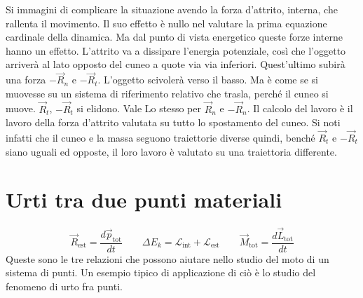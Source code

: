 \documentclass[10pt,a4paper]{book}
\begin{document}
Si immagini di complicare la situazione avendo la forza d'attrito, interna, che rallenta il movimento. Il suo effetto è nullo nel valutare la prima equazione cardinale della dinamica. Ma dal punto di vista energetico queste forze interne hanno un effetto. L'attrito va a dissipare l'energia potenziale, così che l'oggetto arriverà al lato opposto del cuneo a quote via via inferiori. Quest'ultimo subirà una forza $-\vec{R}_n$ e $-\vec{R}_t$. L'oggetto scivolerà verso il basso. Ma è come se si muovesse su un sistema di riferimento relativo che trasla, perché il cuneo si muove. $\vec{R}_t$, $-\vec{R}_t$ si elidono. Vale Lo stesso per $\vec{R}_n$ e $-\vec{R}_n$. Il calcolo del lavoro è il lavoro della forza d'attrito valutata su tutto lo spostamento del cuneo. Si noti infatti che il cuneo e la massa seguono traiettorie diverse quindi, benché $\vec{R}_t$ e $-\vec{R}_t$ siano uguali ed opposte, il loro lavoro è valutato su una traiettoria differente.







































\section{Urti tra due punti materiali}

\[
	\vec{R}_\text{est}=\frac{d\vec{p}_\text{tot}}{dt} \qquad \Delta E_k=\mathcal{L}_\text{int}+\mathcal{L}_\text{est} \qquad \vec{M}_\text{tot}=\frac{d\vec{L}_\text{tot}}{dt}
\]
Queste sono le tre relazioni che possono aiutare nello studio del moto di un sistema di punti. Un esempio tipico di applicazione di ciò è lo studio del fenomeno di urto fra punti.
\end{document}
